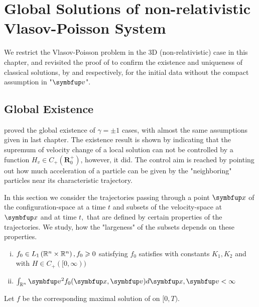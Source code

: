 \chapter{Global Solutions of non-relativistic Vlasov-Poisson System}
\label{cha:global-VP}


We restrict the Vlasov-Poisson problem in the 3D (non-relativistic) case in this chapter, and revisited the proof of to confirm the existence and uniqueness of classical solutions, by \cite{pfaffelmoser_global_1992} and \cite*{1991InMat.105..415L} respectively, for the initial data without the compact assumption in "$\vv$".

\section{Global Existence}
\cite{pfaffelmoser_global_1992} proved the global existence of $ \gamma=\pm 1$ cases, with almost the same assumptions given in last chapter. The existence result is shown by indicating that the supremum of velocity change of a local solution can not be controlled by a function $H_{v} \in C_{+}\left(\mathbf{R}_{0}^{+}\right)$, however, it did. The control aim is reached by pointing out how much acceleration of a particle can be given by the "neighboring" particles near its characteristic trajectory.

In this section we consider the trajectories passing through a point $\vx$ of the configuration-space at a time $t$ and subsets of the velocity-space at $\vx$ and at time $t,$ that are defined by certain properties of the trajectories. We study, how the "largeness" of the subsets depends on these properties.


\begin{assumption}
    
  \begin{enumerate}[(i)]
    \item $f_0 \in L_{1}\left({\mathbb{R}}^{n} \times {\mathbb{R}}^{n}\right), f_0 \geqslant 0$ satisfying $f_0$ satisfies \supremumf with constants $K_1, K_2$ and \lipOffVsphere with $H\in C_+([0,\infty))$
    \item $\int_{\bbR^{n}} \vv^{2} f_0(\vx, \vv) d \vx, \vv<\infty$
  \end{enumerate}
\end{assumption}

Let $f$ be the corresponding maximal solution of \eqvp on $[0, T)$. 





